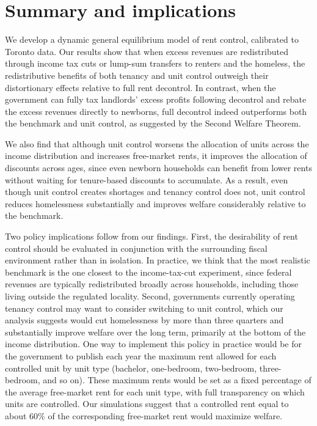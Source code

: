 \documentclass[parskip=full]{article}
\begin{document}
\section{Summary and implications}\label{sec:conclusion}

We develop a dynamic general equilibrium model of rent control, calibrated to Toronto data. Our results show that when excess revenues are redistributed through income tax cuts or lump-sum transfers to renters and the homeless, the redistributive benefits of both tenancy and unit control outweigh their distortionary effects relative to full rent decontrol. In contrast, when the government can fully tax landlords' excess profits following decontrol and rebate the excess revenues directly to newborns, full decontrol indeed outperforms both the benchmark and unit control, as suggested by the Second Welfare Theorem.

We also find that although unit control worsens the allocation of units across the income distribution and increases free-market rents, it improves the allocation of discounts across ages, since even newborn households can benefit from lower rents without waiting for tenure-based discounts to accumulate. As a result, even though unit control creates shortages and tenancy control does not, unit control reduces homelessness substantially and improves welfare considerably relative to the benchmark. 

Two policy implications follow from our findings. First, the desirability of rent control should be evaluated in conjunction with the surrounding fiscal environment rather than in isolation. In practice, we think that the most realistic benchmark is the one closest to the income-tax-cut experiment, since federal revenues are typically redistributed broadly across households, including those living outside the regulated locality. Second, governments currently operating tenancy control may want to consider switching to unit control, which our analysis suggests would cut homelessness by more than three quarters and substantially improve welfare over the long term, primarily at the bottom of the income distribution. One way to implement this policy in practice would be for the government to publish each year the maximum rent allowed for each controlled unit by unit type (bachelor, one-bedroom, two-bedroom, three-bedroom, and so on). These maximum rents would be set as a fixed percentage of the average free-market rent for each unit type, with full transparency on which units are controlled. Our simulations suggest that a controlled rent equal to about 60\% of the corresponding free-market rent would maximize welfare.
\end{document}
